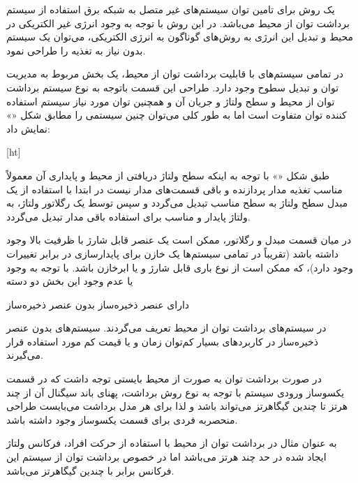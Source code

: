 \label{برداشت توان از محیط}

یک روش برای تامین توان سیستم‌های  غیر متصل به شبکه برق استفاده از سیستم برداشت توان از محیط می‌باشد. در این روش با توجه به وجود انرژی غیر الکتریکی در محیط و تبدیل این انرژی به روش‌های گوناگون به انرژی الکتریکی، می‌توان یک سیستم  بدون نیاز به تغذیه را طراحی نمود.

در تمامی سیستم‌های با قابلیت برداشت توان از محیط، یک بخش مربوط به مدیریت توان و تبدیل سطوح وجود دارد. طراحی این قسمت باتوجه به نوع سیستم‌ برداشت توان از محیط و سطح ولتاژ و جریان آن و همچنین توان مورد نیاز سیستم استفاده کننده توان متفاوت است اما به طور کلی می‌توان چنین سیستمی را مطابق شکل «» نمایش داد:


[ht]


طبق شکل «» با توجه به اینکه سطح ولتاژ دریافتی از محیط و پایداری آن معمولاً مناسب تغذیه مدار پردازنده و باقی قسمت‌های مدار نیست در ابتدا با استفاده از یک مبدل  سطح ولتاژ به سطح مناسب تبدیل می‌گردد و سپس توسط یک رگلاتور ولتاژ، به ولتاژ پایدار و مناسب برای استفاده باقی مدار تبدیل می‌گردد. 

در میان قسمت مبدل  و رگلاتور، ممکن است یک عنصر قابل شارژ با ظرفیت بالا وجود داشته باشد (تقریباً در تمامی سیستم‌ها یک خازن برای پایدارسازی در برابر تغییرات وجود دارد)، که ممکن است از نوع باری قابل شارژ و یا ابرخازن باشد. با توجه به وجود یا عدم وجود این بخش دو دسته

 دارای عنصر ذخیره‌ساز 
 بدون عنصر ذخیره‌ساز 

در سیستم‌های برداشت توان از محیط تعریف می‌گردند. سیستم‌های بدون عنصر ذخیره‌ساز در کاربردهای بسیار کم‌توان ‌زمان و یا قیمت کم مورد استفاده قرار می‌گیرند.

در صورت برداشت توان به صورت  از محیط بایستی توجه داشت که در قسمت یکسوساز ورودی سیستم با توجه به نوع روش برداشت، پهنای باند سیگنال آن از چند هرتز تا چندین گیگاهرتز می‌تواند باشد و لذا برای هر مدل برداشت می‌بایست طراحی منحصربه فردی برای قسمت یکسوساز وجود داشته باشد. 


به عنوان مثال در برداشت توان از محیط با استفاده از حرکت افراد، فرکانس ولتاژ ایجاد شده در حد چند هرتز می‌باشد اما در خصوص برداشت توان از سیستم  این فرکانس برابر با چندین گیگاهرتز می‌باشد.


